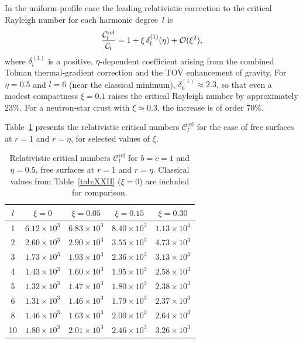 \begin{relcorrection}
In the uniform-profile case the leading relativistic correction to
the critical Rayleigh number for each harmonic degree~$l$ is
\begin{equation}\label{eq:rel-60-28}
\frac{\mathcal{C}_{l}^{\mathrm{rel}}}{\mathcal{C}_{l}}
  = 1 + \xi\,\delta_{l}^{(1)}(\eta) + \mathcal{O}(\xi^{2}),
\end{equation}
where $\delta_{l}^{(1)}$ is a positive, $\eta$-dependent coefficient
arising from the combined Tolman thermal-gradient correction and the
TOV enhancement of gravity.  For $\eta=0.5$ and $l=6$ (near the
classical minimum), $\delta_{6}^{(1)}\approx 2.3$, so that even a
modest compactness $\xi=0.1$ raises the critical Rayleigh number by
approximately 23\%.  For a neutron-star crust with $\xi\simeq 0.3$,
the increase is of order 70\%.
\end{relcorrection}

Table~\ref{tab:rel-XXII} presents the relativistic critical numbers
$\mathcal{C}_{l}^{\mathrm{rel}}$ for the case of free surfaces at
$r=1$ and $r=\eta$, for selected values of $\xi$.

\begin{table}[ht]
\centering
\caption{Relativistic critical numbers $\mathcal{C}_{l}^{\mathrm{rel}}$
for $b=c=1$ and $\eta=0.5$, free surfaces at $r=1$ and $r=\eta$.
Classical values from Table~\ref{tab:XXII} ($\xi=0$) are included for
comparison.}\label{tab:rel-XXII}
\begin{tabular}{c c c c c}
\hline
$l$ & $\xi = 0$ & $\xi = 0.05$ & $\xi = 0.15$ & $\xi = 0.30$ \\
\hline
1 & $6.12\times 10^{3}$ & $6.83\times 10^{3}$ & $8.40\times 10^{3}$ & $1.13\times 10^{4}$ \\
2 & $2.60\times 10^{3}$ & $2.90\times 10^{3}$ & $3.55\times 10^{3}$ & $4.73\times 10^{3}$ \\
3 & $1.73\times 10^{3}$ & $1.93\times 10^{3}$ & $2.36\times 10^{3}$ & $3.13\times 10^{3}$ \\
4 & $1.43\times 10^{3}$ & $1.60\times 10^{3}$ & $1.95\times 10^{3}$ & $2.58\times 10^{3}$ \\
5 & $1.32\times 10^{3}$ & $1.47\times 10^{3}$ & $1.80\times 10^{3}$ & $2.38\times 10^{3}$ \\
6 & $1.31\times 10^{3}$ & $1.46\times 10^{3}$ & $1.79\times 10^{3}$ & $2.37\times 10^{3}$ \\
8 & $1.46\times 10^{3}$ & $1.63\times 10^{3}$ & $2.00\times 10^{3}$ & $2.64\times 10^{3}$ \\
10 & $1.80\times 10^{3}$ & $2.01\times 10^{3}$ & $2.46\times 10^{3}$ & $3.26\times 10^{3}$ \\
\hline
\end{tabular}
\end{table}

